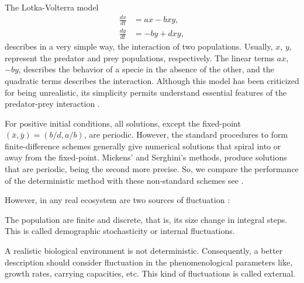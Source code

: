 	The Lotka-Volterra model 
\begin{align} %
	\frac{dx}{dt} &= ax - bxy, \label{eqn:DetLotkaVolterraArnoldA}
	\\
	\frac{dy}{dt} &=-by +dxy,\label{eqn:DetLotkaVolterraArnoldB}
\end{align}
describes in a very simple way, the interaction of two populations. Usually, $x$, $y$, represent
the predator and prey populations, respectively. The linear terms $ax$, $-by$, describes the behavior
of a specie in the absence of the other, and the quadratic terms describes the interaction. 
Although this model has been criticized for being unrealistic, its simplicity permits
understand essential features of the predator-prey interaction \cite{may2001stability}. 

	For positive initial conditions,
all solutions, except the fixed-point $(\bar{x}, \bar{y})=(b/d, a/b)$, are periodic. However, the standard
procedures to form finite-difference schemes generally give numerical solutions that spiral into or away from the 
fixed-point. Mickens' \cite{Mickens2003} and Serghini's \cite{SerghiniMounim2004} methods, produce solutions that are 
periodic, being the 
second more precise. So, we compare the performance of the deterministic \SM method with 
these non-standard schemes see .

	However, in any real ecosystem are two sources of fluctuation \cite{may2001stability}:
\begin{inparaenum}[(i)]
	\item
		The population are finite and discrete, that is, its size change in integral steps. This
		is called demographic stochasticity or internal fluctuations.
	\item
		A realistic biological environment is not deterministic. Consequently, a better description
		should consider fluctuation in the phenomenological parameters like, growth rates, carrying capacities, etc.
		This kind of fluctuations is called external.
\end{inparaenum}


